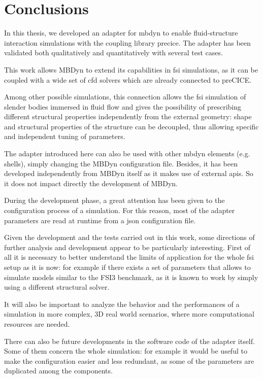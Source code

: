 \chapter{Conclusions}
\label{cha:conclusions}

In this thesis, we  developed an adapter for \acrshort{mbdyn} to enable fluid-structure interaction simulations with the coupling library \acrshort{precice}.
The adapter has been validated both qualitatively and quantitatively with several test cases.

This work allows MBDyn to extend its capabilities in \acrshort{fsi} simulations, as it can be coupled with a wide set of \acrshort{cfd} solvers which are already connected to preCICE.

Among other possible simulations, this connection allows the \acrshort{fsi} simulation of slender bodies immersed in fluid flow and gives the possibility of prescribing different structural properties independently from the external geometry: shape and structural properties of the structure can be decoupled, thus allowing specific and independent tuning of parameters.

The adapter introduced here can also be used with other \acrshort{mbdyn} elements (e.g. shells), simply changing the MBDyn configuration file. Besides, it has been developed independently from MBDyn itself as it makes use of external \acrshort{api}s. So it does not impact directly the development of MBDyn.

During the development phase, a great attention has been given to the configuration process of a simulation. For this reason, most of the adapter parameters are read at runtime from a \acrshort{json} configuration file.  

Given the development and the tests carried out in this work, some directions of further analysis and development appear to be particularly interesting.
First of all it is necessary to better understand the limits of application for the whole \acrshort{fsi} setup as it is now: for example if there exists a set of parameters that allows to simulate models similar to the FSI3 benchmark, as it is known to work by simply using a different structural solver.

It will also be important to analyze the behavior and the performances of a simulation in more complex, 3D real world scenarios, where more computational resources are needed.

There can also be future developments in the software code of the adapter itself. Some of them concern the whole simulation: for example it would be useful to  make the configuration easier and less redundant, as some of the parameters are duplicated among the components.

